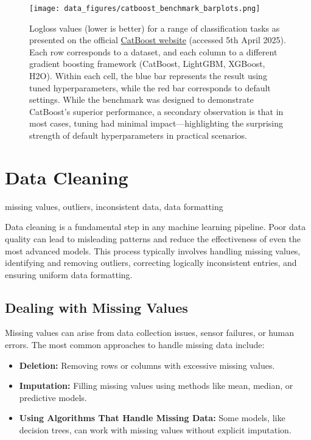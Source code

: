 \documentclass[12pt,openany, draft]{book}
\begin{document}
\begin{figure}[H]
    \centering
    \texttt{[image: data\_figures/catboost\_benchmark\_barplots.png]}
    \caption{
    Logloss values (lower is better) for a range of classification tasks as presented on the official \href{https://catboost.ai/}{CatBoost website} (accessed 5th April 2025). Each row corresponds to a dataset, and each column to a different gradient boosting framework (CatBoost, LightGBM, XGBoost, H2O). Within each cell, the blue bar represents the result using tuned hyperparameters, while the red bar corresponds to default settings. While the benchmark was designed to demonstrate CatBoost’s superior performance, a secondary observation is that in most cases, tuning had minimal impact—highlighting the surprising strength of default hyperparameters in practical scenarios.
    }
    \label{fig:catboost-benchmark}
\end{figure}



\section{Data Cleaning}

\begin{keywordsbox}
missing values, outliers, inconsistent data, data formatting
\end{keywordsbox}

Data cleaning is a fundamental step in any machine learning pipeline. Poor data quality can lead to misleading patterns and reduce the effectiveness of even the most advanced models. This process typically involves handling missing values, identifying and removing outliers, correcting logically inconsistent entries, and ensuring uniform data formatting. \newline

\subsection{Dealing with Missing Values}
Missing values can arise from data collection issues, sensor failures, or human errors. The most common approaches to handle missing data include:

\begin{itemize}
    \item \textbf{Deletion:} Removing rows or columns with excessive missing values.
    \item \textbf{Imputation:} Filling missing values using methods like mean, median, or predictive models.
    \item \textbf{Using Algorithms That Handle Missing Data:} Some models, like decision trees, can work with missing values without explicit imputation.
\end{itemize}
\end{document}
